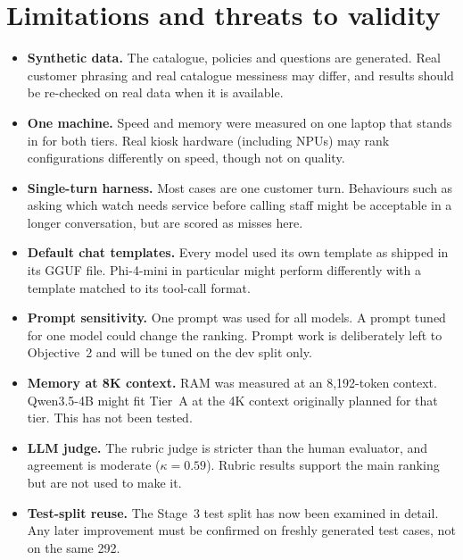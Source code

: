 \documentclass[11pt,a4paper]{article}
\begin{document}
\section{Limitations and threats to validity}\label{sec:limits}
\begin{itemize}
  \item \textbf{Synthetic data.} The catalogue, policies and questions are generated. Real customer phrasing and real
        catalogue messiness may differ, and results should be re-checked on real data when it is available.
  \item \textbf{One machine.} Speed and memory were measured on one laptop that stands in for both tiers. Real kiosk
        hardware (including NPUs) may rank configurations differently on speed, though not on quality.
  \item \textbf{Single-turn harness.} Most cases are one customer turn. Behaviours such as asking which watch needs
        service before calling staff might be acceptable in a longer conversation, but are scored as misses here.
  \item \textbf{Default chat templates.} Every model used its own template as shipped in its GGUF file. Phi-4-mini in
        particular might perform differently with a template matched to its tool-call format.
  \item \textbf{Prompt sensitivity.} One prompt was used for all models. A prompt tuned for one model could change the
        ranking. Prompt work is deliberately left to Objective~2 and will be tuned on the dev split only.
  \item \textbf{Memory at 8K context.} RAM was measured at an 8,192-token context. Qwen3.5-4B might fit Tier~A at the
        4K context originally planned for that tier. This has not been tested.
  \item \textbf{LLM judge.} The rubric judge is stricter than the human evaluator, and agreement is moderate
        ($\kappa = 0.59$). Rubric results support the main ranking but are not used to make it.
  \item \textbf{Test-split reuse.} The Stage~3 test split has now been examined in detail. Any later improvement must
        be confirmed on freshly generated test cases, not on the same 292.
\end{itemize}

\end{document}
